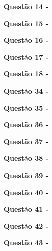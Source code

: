     \vspace{0.5cm}\textbf{Questão 14 -}
    
    \vspace{0.5cm}\textbf{Questão 15 -}
    
    \vspace{0.5cm}\textbf{Questão 16 -}
    
    \vspace{0.5cm}\textbf{Questão 17 -}
    
    \vspace{0.5cm}\textbf{Questão 18 -}
    
    \vspace{0.5cm}\textbf{Questão 34 -}
    
    \vspace{0.5cm}\textbf{Questão 35 -}
    
    \vspace{0.5cm}\textbf{Questão 36 -}
    
    \vspace{0.5cm}\textbf{Questão 37 -}
    
    \vspace{0.5cm}\textbf{Questão 38 -}
    
    \vspace{0.5cm}\textbf{Questão 39 -}
    
    \vspace{0.5cm}\textbf{Questão 40 -}
    
    \vspace{0.5cm}\textbf{Questão 41 -}
    
     \vspace{0.5cm}\textbf{Questão 42 -}
     
      \vspace{0.5cm}\textbf{Questão 43 -}